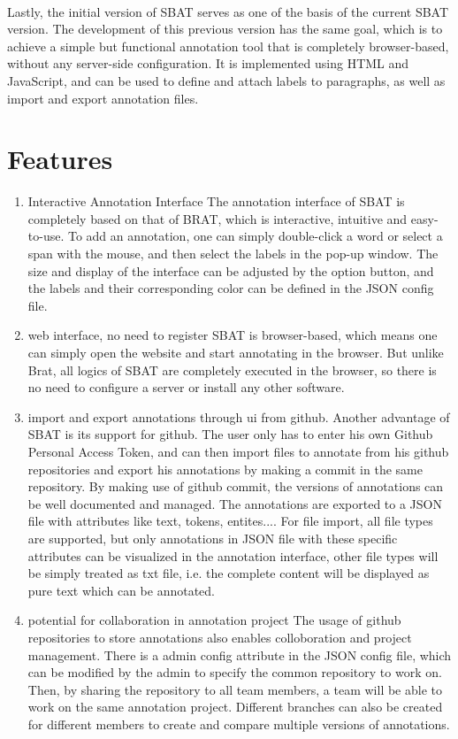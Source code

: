 \documentclass[a4paper]{article}
\begin{document}
\\
Lastly, the initial version of SBAT \cite{SBAT} serves as one of the basis of the current SBAT version. The development of this previous version has the same goal, which is to achieve a simple but functional annotation tool that is completely browser-based, without any server-side configuration. It is implemented using HTML and JavaScript, and can be used to define and attach labels to paragraphs, as well as import and export annotation files.
\section{Features}
\begin{enumerate}
\item Interactive Annotation Interface
The annotation interface of SBAT is completely based on that of BRAT, which is interactive, intuitive and easy-to-use. To add an annotation, one can simply double-click a word or select a span with the mouse, and then select the labels in the pop-up window. The size and display of the interface can be adjusted by the option button, and the labels and their corresponding color can be defined in the JSON config file.
\item web interface, no need to register
SBAT is browser-based, which means one can simply open the website and start annotating in the browser. But unlike Brat, all logics of SBAT are completely executed in the browser, so there is no need to configure a server or install any other software.
\item import and export annotations through ui from github.
Another advantage of SBAT is its support for github. The user only has to enter his own Github Personal Access Token, and can then import files to annotate from his github repositories and export his annotations by making a commit in the same repository. By making use of github commit, the versions of annotations can be well documented and managed. The annotations are exported to a JSON file with attributes like text, tokens, entites.... For file import, all file types are supported, but only annotations in JSON file with these specific attributes can be visualized in the annotation interface, other file types will be simply treated as txt file, i.e. the complete content will be displayed as pure text which can be annotated.
\item potential for collaboration in annotation project
The usage of github repositories to store annotations also enables colloboration and project management. There is a admin config attribute in the JSON config file, which can be modified by the admin to specify the common repository to work on. Then, by sharing the repository to all team members, a team will be able to work on the same annotation project. Different branches can also be created for different members to create and compare multiple versions of annotations.
\end{enumerate}
\end{document}
